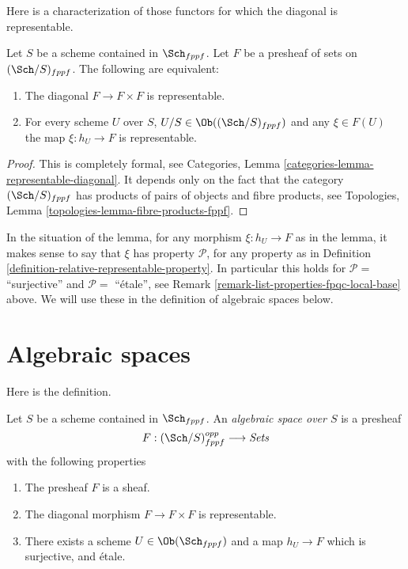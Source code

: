 \noindent
Here is a characterization of those functors for which the
diagonal is representable.

\begin{lemma}
\label{lemma-representable-diagonal}
Let $S$ be a scheme contained in $\Sch_{fppf}$.
Let $F$ be a presheaf of sets on $(\Sch/S)_{fppf}$.
The following are equivalent:
\begin{enumerate}
\item The diagonal $F \to F \times F$ is representable.
\item For every scheme $U$ over $S$,
$U/S \in \Ob((\Sch/S)_{fppf})$
and any $\xi \in F(U)$ the map $\xi : h_U \to F$ is representable.
\end{enumerate}
\end{lemma}

\begin{proof}
This is completely formal, see
Categories, Lemma \ref{categories-lemma-representable-diagonal}.
It depends only on the fact that the category $(\Sch/S)_{fppf}$
has products of pairs of objects and fibre products, see
Topologies, Lemma \ref{topologies-lemma-fibre-products-fppf}.
\end{proof}

\noindent
In the situation of the lemma, for any morphism
$\xi : h_U \to F$ as in the lemma, it makes sense
to say that $\xi$ has property $\mathcal{P}$, for any property
as in Definition \ref{definition-relative-representable-property}.
In particular this holds for $\mathcal{P} = $ ``surjective''
and $\mathcal{P} = $ ``\'etale'', see
Remark \ref{remark-list-properties-fpqc-local-base}
above. We will use these in the definition
of algebraic spaces below.


















\section{Algebraic spaces}
\label{section-algebraic-spaces}

\noindent
Here is the definition.

\begin{definition}
\label{definition-algebraic-space}
Let $S$ be a scheme contained in $\Sch_{fppf}$.
An {\it algebraic space over $S$} is a presheaf
$$
F : (\Sch/S)^{opp}_{fppf} \longrightarrow \textit{Sets}
$$
with the following properties
\begin{enumerate}
\item The presheaf $F$ is a sheaf.
\item The diagonal morphism $F  \to F \times F$ is representable.
\item There exists a scheme $U \in \Ob(\Sch_{fppf})$
and a map $h_U \to F$ which is surjective, and \'etale.
\end{enumerate}
\end{definition}

